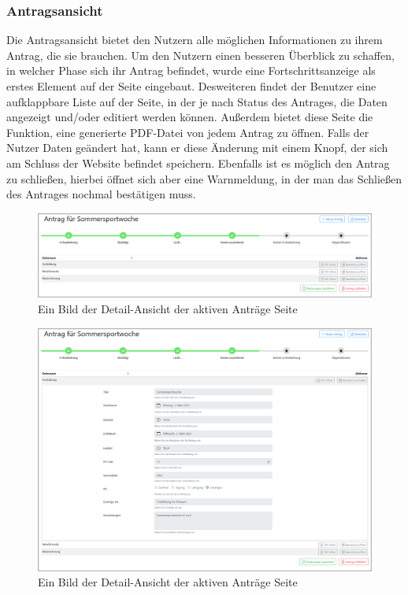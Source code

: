 \subsubsection{Antragsansicht}
\label{chapter:implementierung-frontend-komponenten-antragsansicht}
Die Antragsansicht bietet den Nutzern alle möglichen Informationen zu ihrem Antrag, die sie brauchen. Um den Nutzern einen besseren Überblick zu schaffen, in welcher Phase sich ihr Antrag befindet, wurde eine Fortschrittsanzeige als erstes Element auf der Seite eingebaut. Desweiteren findet der Benutzer eine aufklappbare Liste auf der Seite, in der je nach Status des Antrages, die Daten angezeigt und/oder editiert werden können. Außerdem bietet diese Seite die Funktion, eine generierte PDF-Datei von jedem Antrag zu öffnen. Falls der Nutzer Daten geändert hat, kann er diese Änderung mit einem Knopf, der sich am Schluss der Website befindet speichern. Ebenfalls ist es möglich den Antrag zu schließen, hierbei öffnet sich aber eine Warnmeldung, in der man das Schließen des Antrages nochmal bestätigen muss.
\begin{figure}[H]
	\centering
	\includegraphics[width=1\linewidth]{images/website/antrag_zu}
	\caption[Aktiv]{Ein Bild der Detail-Ansicht der aktiven Anträge Seite}
	\label{fig:antragaktivdetail}
\end{figure}
\begin{figure}[H]
	\centering
	\includegraphics[width=1\linewidth]{images/website/antrag}
	\caption[Aktiv]{Ein Bild der Detail-Ansicht der aktiven Anträge Seite}
	\label{fig:antragaktivdetail}
\end{figure}
